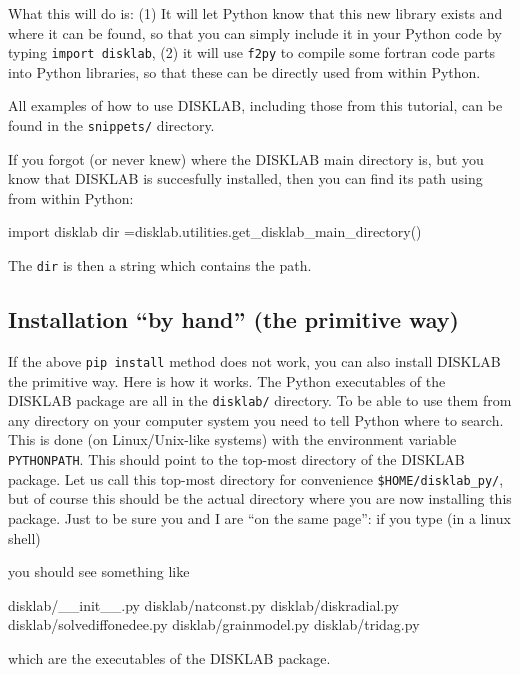 \documentclass{book}
\newcommand{\code}[1]{{\small\tt #1}}
\begin{document}
What this will do is: (1) It will let Python know that this new library exists
and where it can be found, so that you can simply include it in your Python
code by typing \code{import disklab}, (2) it will use \code{f2py} to compile
some fortran code parts into Python libraries, so that these can be directly
used from within Python.

All examples of how to use {\sf DISKLAB}, including those from this tutorial,
can be found in the \code{snippets/} directory.

If you forgot (or never knew) where the {\sf DISKLAB} main directory is, but you
know that {\sf DISKLAB} is succesfully installed, then you can find its path
using from within Python:
\begin{codebox}
import disklab
dir =disklab.utilities.get_disklab_main_directory()
\end{codebox}
The \code{dir} is then a string which contains the path.


\subsection{Installation ``by hand'' (the primitive way)}
If the above \code{pip install} method does not work, you can also install
{\sf DISKLAB} the primitive way. Here is how it works.
The Python executables of the {\sf DISKLAB} package are all in the
\code{disklab/} directory. To be able to use them from any directory on your
computer system you need to tell Python where to search. This is done (on
Linux/Unix-like systems) with the environment variable \code{PYTHONPATH}.  This
should point to the top-most directory of the {\sf DISKLAB} package.  Let us
call this top-most directory for convenience \code{\$HOME/disklab\_py/}, but of
course this should be the actual directory where you are now installing this
package. Just to be sure you and I are ``on the same page'': if you type (in a
linux shell)
you should see something like
\begin{codebox}
disklab/__init__.py        disklab/natconst.py
disklab/diskradial.py       disklab/solvediffonedee.py
disklab/grainmodel.py       disklab/tridag.py
\end{codebox}
which are the executables of the {\sf DISKLAB} package.
\end{document}
